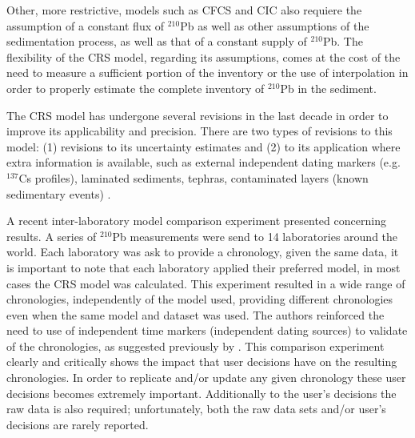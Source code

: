 \documentclass [10pt] {article}
\begin{document}
Other, more restrictive, models such as CFCS and CIC also requiere the assumption of a constant flux of $^{210}$Pb as well as other assumptions of the sedimentation process, as well as that of a constant supply of $^{210}$Pb.
The flexibility of the CRS model, regarding its assumptions, comes at the cost of the need to measure a sufficient portion of the inventory or the use of interpolation in order to properly estimate the complete inventory of $^{210}$Pb in the sediment. 

The CRS model has undergone several revisions in the last decade in order to improve its applicability and precision. 
There are two types of revisions to this model: (1) revisions to its uncertainty estimates \citep[eg. ][]{Binford1990,Appleby2001,Sanchez-Cabeza2014} and (2) to its application where extra information is available, such as external independent dating markers (e.g. $^{137}$Cs profiles), laminated sediments, tephras, contaminated layers (known sedimentary events) \citep[eg.][]{Appleby1998,Appleby2001,Appleby2008}. 

A recent inter-laboratory model comparison experiment \citep{Barsanti2020} presented concerning results.
A series of $^{210}$Pb measurements were send to 14 laboratories around the world.
Each laboratory was ask to provide a chronology, given the same data, it is important to note that each laboratory applied their preferred model, in most cases the CRS model was calculated.
This experiment resulted in a wide range of chronologies, independently of the model used, providing different chronologies even when the same model and dataset was used.
The authors reinforced the need to use of independent time markers (independent dating sources) to validate of the chronologies, as suggested previously by \citep{Smith2001}.  
This comparison experiment clearly and critically shows the impact that user decisions have on the resulting chronologies.
In order to replicate and/or update any given chronology these user decisions becomes extremely important.
Additionally to the user's decisions the raw data is also required; unfortunately, both the raw data sets and/or user's decisions are rarely reported.
\end{document}

